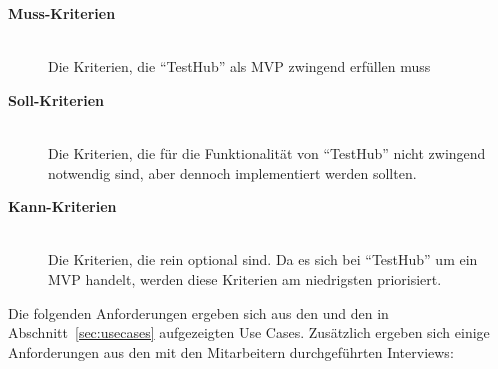 \begin{description}
    \item[\textbf{Muss-Kriterien}]\hfill \\
    Die Kriterien, die ``TestHub'' als \gls{MVP} zwingend erfüllen muss

    \item[\textbf{Soll-Kriterien}]\hfill \\
    Die Kriterien, die für die Funktionalität von ``TestHub''
    nicht zwingend notwendig sind, aber dennoch implementiert werden sollten.

    \item[\textbf{Kann-Kriterien}]\hfill \\
    Die Kriterien, die rein optional sind. Da es sich
    bei ``TestHub'' um ein \gls{MVP} handelt, werden diese Kriterien am niedrigsten priorisiert.

\end{description}

Die folgenden Anforderungen ergeben sich aus den  und den
in Abschnitt~\ref{sec:usecases} aufgezeigten Use Cases. Zusätzlich ergeben sich einige 
Anforderungen aus den mit den Mitarbeitern durchgeführten Interviews:

